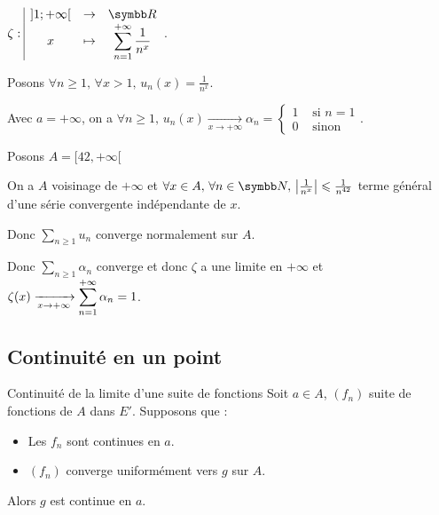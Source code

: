 \begin{exemple}
    $\fonction \zeta{]1; +\infty[}{\R}{x}{\sum_{n = 1}^{+ \infty} \frac 1 {n^x}}$.

    Posons $\forall n \geqslant 1, \, \forall x > 1, \, u_n(x) = \frac 1 {n^x}$.

    Avec $a = + \infty$, on a $\forall n \geqslant 1, \, u_n(x) \xrightarrow[x \to +\infty]{} \alpha_n = \left\{\begin{array}{cc} 1 & \text{ si } n = 1 \\ 0 & \text{ sinon } \end{array} \right.$.
        
    Posons $A = [42, + \infty[$

    On a $A$ voisinage de $+ \infty$ et $\forall x \in A, \, \forall n \in \N, \, \left| \frac{1}{n^x} \right| \leqslant \frac 1 {n^{42}}$ 
    terme général d'une série convergente indépendante de $x$.

    Donc $\displaystyle \sum_{n \geqslant 1} u_n$ converge normalement sur $A$. 

    Donc $\displaystyle \sum_{n \geqslant 1} \alpha_n$ converge et donc $\zeta$ a une limite en $+ \infty$ et 
    $\displaystyle \zeta(x) \xrightarrow[x \to +\infty]{} \sum_{n = 1}^{+\infty} \alpha_n = 1$.

\end{exemple}

\subsection{Continuité en un point}

\begin{proposition}{Continuité de la limite d'une suite de fonctions}{}
    Soit $a \in A$, $(f_n)$ suite de fonctions de $A$ dans $E'$. Supposons que : 
    \begin{itemize}
        \item Les $f_n$ sont continues en $a$.
        \item $(f_n)$ converge uniformément vers $g$ sur $A$.
    \end{itemize}
    Alors $g$ est continue en $a$.
\end{proposition}


